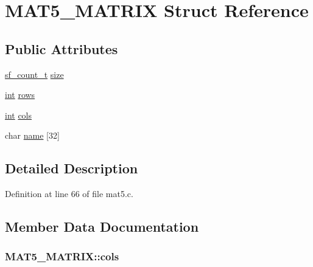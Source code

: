 \hypertarget{struct_m_a_t5___m_a_t_r_i_x}{}\section{M\+A\+T5\+\_\+\+M\+A\+T\+R\+IX Struct Reference}
\label{struct_m_a_t5___m_a_t_r_i_x}
\subsection*{Public Attributes}
\begin{DoxyCompactItemize}
\item 
\hyperlink{mac_2config_2i386_2lib-src_2libsndfile_2src_2sndfile_8h_a398121a5f562230ea7f772528fff5f84}{sf\+\_\+count\+\_\+t} \hyperlink{struct_m_a_t5___m_a_t_r_i_x_a2914ef5a45a883a0911e65846958720d}{size}
\item 
\hyperlink{xmltok_8h_a5a0d4a5641ce434f1d23533f2b2e6653}{int} \hyperlink{struct_m_a_t5___m_a_t_r_i_x_ac9c07ec578a2e4ab0c8a9cc33b2ece2f}{rows}
\item 
\hyperlink{xmltok_8h_a5a0d4a5641ce434f1d23533f2b2e6653}{int} \hyperlink{struct_m_a_t5___m_a_t_r_i_x_a1388bdc748717b1ee977b00d7cde3dfe}{cols}
\item 
char \hyperlink{struct_m_a_t5___m_a_t_r_i_x_acda2d7cfed0698f69d29194fb9221621}{name} \mbox{[}32\mbox{]}
\end{DoxyCompactItemize}


\subsection{Detailed Description}


Definition at line 66 of file mat5.\+c.



\subsection{Member Data Documentation}
\subsubsection[{\texorpdfstring{cols}{cols}}]{ M\+A\+T5\+\_\+\+M\+A\+T\+R\+I\+X\+::cols}\hypertarget{struct_m_a_t5___m_a_t_r_i_x_a1388bdc748717b1ee977b00d7cde3dfe}{}\label{struct_m_a_t5___m_a_t_r_i_x_a1388bdc748717b1ee977b00d7cde3dfe}


